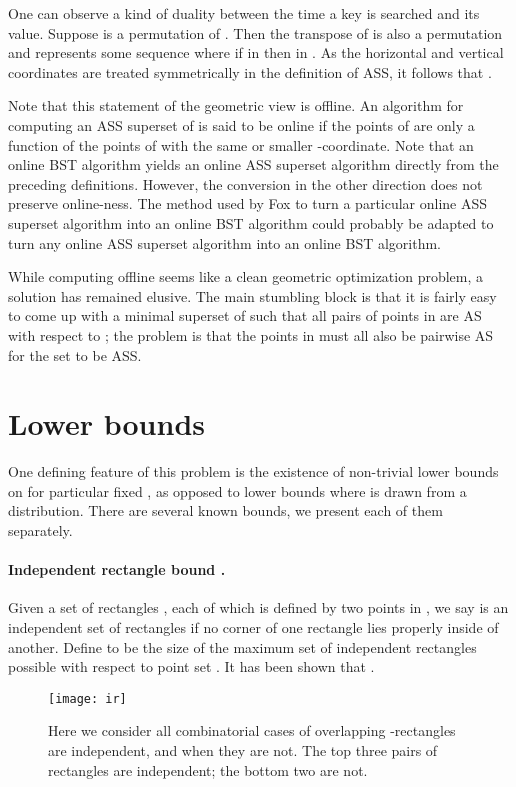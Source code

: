 \documentclass[11pt]{article}
\begin{document}
One can observe a kind of duality between the time a key is searched and its value.
Suppose  is a permutation of . Then the transpose of  is also a permutation  and represents some sequence  where if  in  then  in . 
As the horizontal and vertical coordinates are treated symmetrically in the definition of ASS, it follows that . 

Note that this statement of the geometric view is offline. An algorithm for computing an ASS superset  of  is said to be online if the points of  are only a function of the points of  with the same or smaller -coordinate. Note that an online BST algorithm yields an online ASS superset algorithm directly from the preceding definitions. However, the conversion in the other direction does not preserve online-ness. The method used by Fox \cite{DBLP:conf/wads/Fox11} to turn a particular online ASS superset algorithm into an online BST algorithm could probably be adapted to turn any online ASS superset algorithm into an online BST algorithm.

While computing  offline seems like a clean geometric optimization problem, a solution has remained elusive. The main stumbling block is that it is fairly easy to come up with a minimal superset  of  such that all pairs of points in  are AS with respect to ; the problem is that the points in  must all also be pairwise AS for the set  to be ASS.


\section{Lower bounds}

One defining feature of this problem is the existence of non-trivial lower bounds on  for particular fixed , as opposed to lower bounds where  is drawn from a distribution. There are several known bounds, we present each of them separately.

\paragraph{Independent rectangle bound \cite{DBLP:conf/soda/DemaineHIKP09}.}
Given a set of rectangles , each of which is defined by two points in , we say  is an independent set of rectangles if no corner of one rectangle lies properly inside of another. Define  to be the size of the maximum set of independent rectangles possible with respect to point set . It has been shown that .

\begin{figure}
\begin{center}
\texttt{[image: ir]}
\end{center}
\caption{Here we consider all combinatorial cases of overlapping -rectangles are independent, and when they are not. The top three pairs of rectangles are independent; the bottom two are not.}
\label{fig:ir}
\end{figure}
\end{document}
